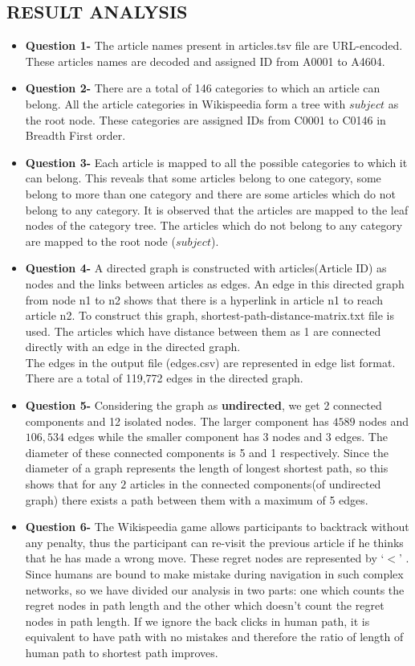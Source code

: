 \documentclass{article}
\begin{document}
\subsection{RESULT ANALYSIS}
\begin{itemize}
    \item \textbf{Question 1-} The article names present in articles.tsv file are URL-encoded. These articles names are decoded and assigned ID from A0001 to A4604.
    \item \textbf{Question 2-}  There are a total of 146 categories to which an article can belong. All the article categories in Wikispeedia form a tree with $subject$ as the root node. These categories are assigned IDs from C0001 to C0146 in Breadth First order.
    \item \textbf{Question 3-} Each article is mapped to all the possible categories to which it can belong. This reveals that some articles belong to one category, some belong to more than one category and there are some articles which do not belong to any category. It is observed that the articles are mapped to the leaf nodes of the category tree. The articles which do not belong to any category are mapped to the root node ($subject$).
    \item \textbf{Question 4-} A directed graph is constructed with articles(Article ID) as nodes and the links between articles as edges. An edge in this directed graph from node n1 to n2 shows that there is a hyperlink in article n1 to reach article n2. To construct this graph, shortest-path-distance-matrix.txt file is used. The articles which have distance between them as 1 are connected directly with an edge in the directed graph.\\ 
    The edges in the output file (edges.csv) are represented in edge list format. There are a total of 119,772 edges in the directed graph.
    \item \textbf{Question 5-} Considering the graph as \textbf{undirected}, we get 2 connected components and 12 isolated nodes. The larger component has $4589$ nodes and $106,534$ edges while the smaller component has $3$ nodes and $3$ edges. The diameter of these connected components is 5 and 1 respectively. Since the diameter of a graph represents the length of longest shortest path, so this shows that for any $2$ articles in the connected components(of undirected graph) there exists a path between them with a maximum of 5 edges.
    \item \textbf{Question 6-} The Wikispeedia game allows participants to backtrack without any penalty, thus the participant can re-visit the previous article if he thinks that he has made a wrong move. These regret nodes are represented by `$<$' . Since humans are bound to make mistake during navigation in such complex networks, so we have divided our analysis in two parts: one which counts the regret nodes in path length and the other which doesn't count the regret nodes in path length. If we ignore the back clicks in human path, it is equivalent to have path with no mistakes and therefore the ratio of length of human path to shortest path improves.\\

\end{itemize}
\end{document}
